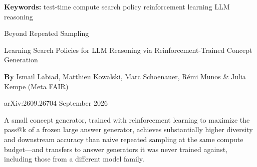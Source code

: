 \documentclass[10pt,twocolumn]{article}
\begin{document}
\setlength{\parindent}{0pt}
\setlength{\parskip}{4pt}

{\small\color{keywordgray}\textbf{Keywords:}
  test-time compute \textbullet{}
  search policy \textbullet{}
  reinforcement learning \textbullet{}
  LLM reasoning}\par\vspace{4pt}

{\LARGE\bfseries\raggedright
  Beyond Repeated Sampling}\par\vspace{4pt}

{\large\itshape\raggedright
  Learning Search Policies for LLM Reasoning via
  Reinforcement-Trained Concept Generation}\par\vspace{6pt}

{\small\textbf{By} Ismail Labiad, Matthieu Kowalski, Marc Schoenauer,
  R\'emi Munos \& Julia Kempe (Meta FAIR)}\par\vspace{2pt}

{\small\color{keywordgray}arXiv:2609.26704 \textbullet{} September 2026}
\par\vspace{2pt}\noindent{\color{rulered}\rule{\columnwidth}{0.6pt}}\vspace{6pt}

A small concept generator, trained with reinforcement learning to maximize
the pass@k of a frozen large answer generator, achieves substantially higher
diversity and downstream accuracy than naive repeated sampling at the same
compute budget---and transfers to answer generators it was never trained
against, including those from a different model family.
\end{document}
